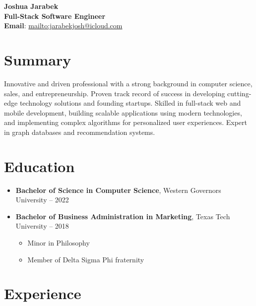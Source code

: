 \documentclass[a4paper,10pt]{article}
\newcommand{\infoitem}[2]{\textbf{#1}: \href{#2}{#2}}
\begin{document}
\begin{center}
    \textbf{\Huge Joshua Jarabek} \\
    \vspace{2mm}
    \textbf{Full-Stack Software Engineer} \\
    \vspace{2mm}
    \infoitem{Email}{mailto:jarabekjosh@icloud.com} \quad {}
\end{center}

\vspace{5mm}

\section*{Summary}
Innovative and driven professional with a strong background in computer science, sales, and entrepreneurship. Proven track record of success in developing cutting-edge technology solutions and founding startups. Skilled in full-stack web and mobile development, building scalable applications using modern technologies, and implementing complex algorithms for personalized user experiences. Expert in graph databases and recommendation systems.

\section*{Education}
\begin{itemize}[leftmargin=0in, label={}]
    \item \textbf{Bachelor of Science in Computer Science}, Western Governors University -- 2022
    \item \textbf{Bachelor of Business Administration in Marketing}, Texas Tech University -- 2018
          \begin{itemize}
              \item Minor in Philosophy
              \item Member of Delta Sigma Phi fraternity
          \end{itemize}
\end{itemize}

\section*{Experience}
\end{document}
